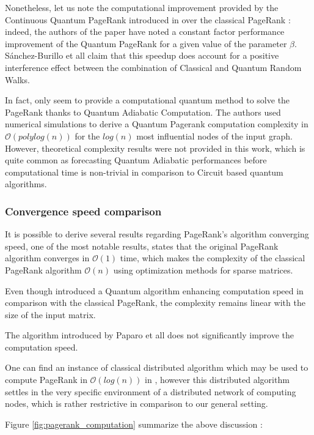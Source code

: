 \documentclass[sn-mathphys]{sn-jnl}%
\theoremstyle{thmstyleone}%
\theoremstyle{thmstyletwo}%
\theoremstyle{thmstylethree}%
\begin{document}
Nonetheless, let us note the computational improvement provided by the
Continuous Quantum PageRank introduced in
\cite{sanchez-burillo_duch_gomez-gardenes_zueco_2012} over the
classical PageRank : indeed, the authors of the paper have noted a
constant factor performance improvement of the Quantum PageRank for a
given value of the parameter $\beta$. Sánchez-Burillo et all claim
that this speedup does account for a positive interference effect
between the combination of Classical and Quantum Random Walks.

In fact, only \cite{garnerone_zanardi_lidar_2012} seem to provide a
computational quantum method to solve the PageRank thanks to Quantum
Adiabatic Computation. The authors used numerical simulations to
derive a Quantum Pagerank computation complexity in
$\mathcal{O}(polylog(n))$ for the $log(n)$ most influential nodes of
the input graph. However, theoretical complexity results were not
provided in this work, which is quite common as forecasting Quantum
Adiabatic performances before computational time is non-trivial in
comparison to Circuit based quantum algorithms.

\subsubsection{Convergence speed comparison}
It is possible to derive several results regarding PageRank's
algorithm converging speed, one of the most notable results, states
that the original PageRank algorithm converges in $\mathcal{O}(1)$
time, which makes the complexity of the classical PageRank algorithm
$\mathcal{O}(n)$ using optimization methods for sparse matrices.

Even though \cite{sanchez-burillo_duch_gomez-gardenes_zueco_2012}
introduced a Quantum algorithm enhancing computation speed in
comparison with the classical PageRank, the complexity remains linear
with the size of the input matrix.

The algorithm introduced by Paparo et all
\cite{paparo_martin-delgado_2012} does not significantly improve the
computation speed.

One can find an instance of classical distributed algorithm which may
be used to compute PageRank in $\mathcal{O}(log(n))$ in
\cite{sarma_molla_pandurangan_upfal_2013}, however this distributed
algorithm settles in the very specific environment of a distributed
network of computing nodes, which is rather restrictive in comparison
to our general setting.

Figure \ref{fig:pagerank_computation} summarize the above discussion :
\end{document}
